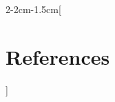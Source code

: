 \documentclass[notitlepage,openany,11pt]{report}
\theoremstyle{plain}%
\numberwithin{equation}{section}
\begin{document}
\let\oldthebibliography=\thebibliography
\let\endoldthebibliography=\endthebibliography
\renewenvironment{thebibliography}[1]{%
    \begin{oldthebibliography}{#1}%
    \setlength{\parskip}{3pt plus 2pt minus 1pt}%
    \setlength{\itemsep}{3pt}%
}%
{%
    \end{oldthebibliography}%
}

\begin{adjmulticols*}{2}{-2cm}{-1.5cm}[\section*{References}] %

\noindent
\footnotesize %
\begin{flushleft}


\end{flushleft}
\normalsize

\end{adjmulticols*}
\end{document}
